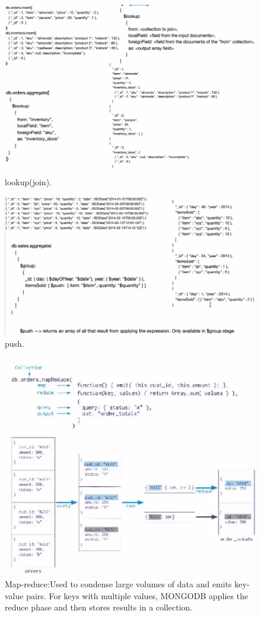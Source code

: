 \documentclass{article}
\begin{document}
\begin{figure}[h!]
\includegraphics[scale=0.7]{15.png}
\caption{lookup(join).}
\end{figure}
\begin{figure}[h!]
\includegraphics[scale=0.7]{16.png}
\caption{push.}
\end{figure}
\begin{figure}[t]
\includegraphics[scale=0.7]{17.png}
\caption{Map-reduce:Used to condense large volumes of data and emits key-value pairs. For keys with multiple values, MONGODB applies the reduce phase and then stores results in a collection.}
\end{figure}
\end{document}
